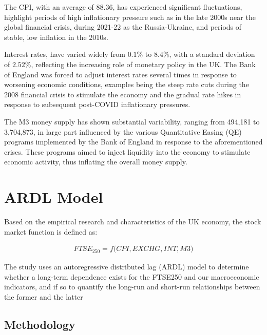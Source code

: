 \documentclass[11pt,a4paper]{article}
\begin{document}
The CPI, with an average of 88.36, has 
experienced significant fluctuations, highlight periods of high inflationary pressure such as in the late 2000s 
near the global financial crisis, during 2021-22 as the Russia-Ukraine, and periods of stable, low
inflation in the 2010s.

Interest rates, have varied widely from $0.1\%$ to $8.4\%$, with a standard deviation of $2.52\%$, reflecting the 
increasing role of monetary policy in the UK. The Bank of England was forced to adjust interest rates 
several times in response to worsening economic conditions, examples being the steep rate cuts during the 2008 financial crisis to stimulate the economy and the gradual rate hikes in response to 
subsequent post-COVID inflationary pressures. 

The M3 money supply has shown substantial variability, ranging from 494,181 to 3,704,873, 
in large part influenced by the various Quantitative Easing (QE) programs implemented by the Bank of England 
in response to the aforementioned crises. These programs aimed to inject liquidity into the economy to stimulate economic activity, thus inflating the overall money supply.

\section{ARDL Model}

Based on the empirical research and characteristics of the UK economy,
the stock market function is defined as:

\begin{align}
    FTSE_{250} = f\biggl(CPI, EXCHG, INT, M3\biggr) \label{eq:implicit}
\end{align}

The study uses an autoregressive distributed lag (ARDL) model to determine 
whether a long-term dependence exists for the FTSE250 and our macroeconomic 
indicators, and if so to quantify the long-run and short-run relationships
between the former and the latter 

\subsection{Methodology}
\end{document}
